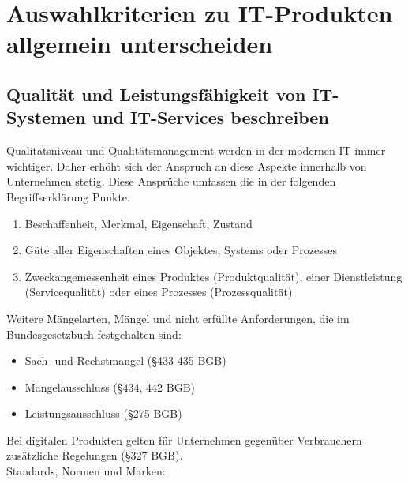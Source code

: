 \section{Auswahlkriterien zu IT-Produkten allgemein unterscheiden}
\subsection{Qualität und Leistungsfähigkeit von IT-Systemen und IT-Services beschreiben}
    \begin{subindent}
        Qualitätsniveau und Qualitätsmanagement werden in der modernen IT immer wichtiger.
        Daher erhöht sich der Anspruch an diese Aspekte innerhalb von Unternehmen stetig. Diese Ansprüche umfassen die in der folgenden Begriffserklärung Punkte.
    \end{subindent}
    \begin{tcolorbox}[width=13cm, center, title=Qualitätsbegriff, coltitle=white, colframe=white!20!blue, colback=white!80!blue]
        \begin{enumerate}[itemsep=0.01em, parsep=0.3em]
            \item Beschaffenheit, Merkmal, Eigenschaft, Zustand
            \item Güte aller Eigenschaften eines Objektes, Systems oder Prozesses
            \item Zweckangemessenheit eines Produktes (Produktqualität), einer Dienstleistung (Servicequalität) oder eines Prozesses (Prozessqualität)
        \end{enumerate}
    \end{tcolorbox}
    \begin{subindent}
        Weitere Mängelarten, Mängel und nicht erfüllte Anforderungen, die im Bundesgesetzbuch festgehalten sind:
    \end{subindent}
    \begin{itemize}[leftmargin=2.5cm, topsep=0.3em, itemsep=0.1em, parsep=0.5em]
        \item Sach- und Rechstmangel (§433-435 BGB)
        \item Mangelausschluss (§434, 442 BGB)
        \item Leistungsausschluss (§275 BGB)
    \end{itemize}
    \begin{subindent}
        Bei digitalen Produkten gelten für Unternehmen gegenüber Verbrauchern zusätzliche Regelungen (§327 BGB). \\
        Standards, Normen und Marken:
    \end{subindent}
